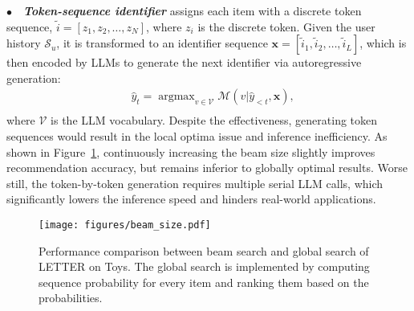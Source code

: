\vspace{2pt}
\noindent$\bullet\quad$\textbf{\textit{Token-sequence identifier}} assigns each item with a discrete token sequence, \ie $\tilde{i} = [z_1, z_2, \dots, z_N]$, where $z_i$ is the discrete token. 
Given the user history $\mathcal{S}_u$, it is transformed to an identifier sequence $\bm{x}= [\tilde{i}_1, \tilde{i}_2, \dots, \tilde{i}_L]$, which is then encoded by LLMs to generate the next identifier via autoregressive generation: 
\begin{equation}
\begin{aligned}
    &\hat{y}_t = \mathop{\arg\max}_{v\in\mathcal{V}} \mathcal{M}(v|\hat{y}_{<t},\bm{x}), \\
\end{aligned}
\end{equation} 
where $\mathcal{V}$ is the LLM vocabulary. 
Despite the effectiveness, generating token sequences would result in the local optima issue and inference inefficiency. 
As shown in Figure~\ref{fig:beam_size}, continuously increasing the beam size slightly improves recommendation accuracy, but remains inferior to globally optimal results. 
Worse still, the token-by-token generation requires multiple serial LLM calls, which significantly lowers the inference speed and hinders real-world applications.

\begin{figure}[t]
\setlength{\abovecaptionskip}{0.0cm}
\setlength{\belowcaptionskip}{-0.3cm}
\centering
\texttt{[image: figures/beam\_size.pdf]}
\caption{Performance comparison between beam search and global search of LETTER on Toys. The global search is implemented by computing sequence probability for every item and ranking them based on the probabilities. }
\label{fig:beam_size}
\end{figure}





